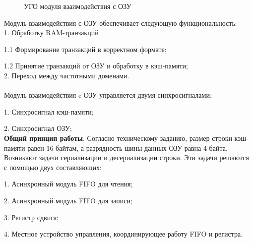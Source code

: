 \documentclass[13pt]{article}
\begin{document}
    \begin{figure}[h!]
		\caption{УГО модуля взаимодействия с ОЗУ}
	\end{figure}
    Модуль взаимодействия с ОЗУ обеспечивает следующую функциональность:\\
    1. Обработку RAM-транзакций
    
    1.1 Формирование транзакций в корректном формате;
    
    1.2 Принятие транзакций от ОЗУ и обработку в кэш-памяти;\\
    2. Переход между частотными доменами.\\\\
    Модуль взаимодействия c ОЗУ управляется двумя синхросигналами:
    
    1. Синхросигнал кэш-памяти;
    
    2. Синхросигнал ОЗУ;\\
    
    \textbf{Общий принцип работы}. Согласно техническому заданию, размер строки кэш-памяти равен 16 байтам, а разрядность шины данных ОЗУ равна 4 байта. Возникают задачи сериализации и десериализации строки. Эти задачи решаются с помощью двух составляющих:
    
    1. Асинхронный модуль FIFO для чтения;
    
    2. Асинхронный модуль FIFO для записи;
    
    3. Регистр сдвига;
    
    4. Местное устройство управления, координирующее работу FIFO и регистра.
    
\end{document}
